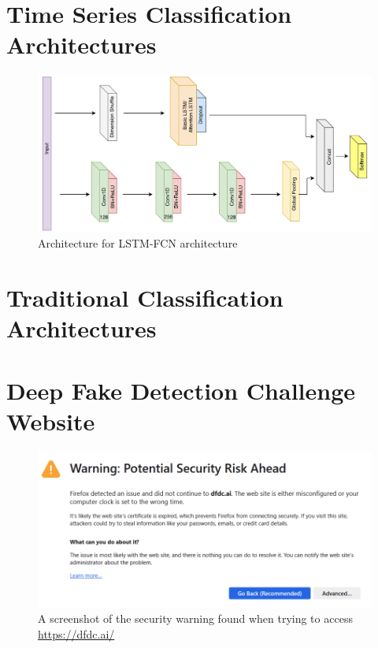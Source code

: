 \chapter{Time Series Classification Architectures}
\label{ch:series-architectures}

\begin{figure}[h]
    \centering
    \includegraphics[width=0.75\linewidth]{dissertation//figures/lstm-fcn.png}
    \caption{Architecture for LSTM-FCN architecture\cite{karim2017lstm}}
    \label{fig:lstm-fcn}
\end{figure}

\chapter{Traditional Classification Architectures}
\label{ch:trad-architectures}

\chapter{Deep Fake Detection Challenge Website}
\label{ch:dfdcai}

\begin{figure}[h]
    \centering
    \includegraphics[width=1\linewidth]{dissertation//figures/dfdc.png}
    \caption{A screenshot of the security warning found when trying to access \url{https://dfdc.ai/}}
    \label{fig:dfdcai}
\end{figure}

